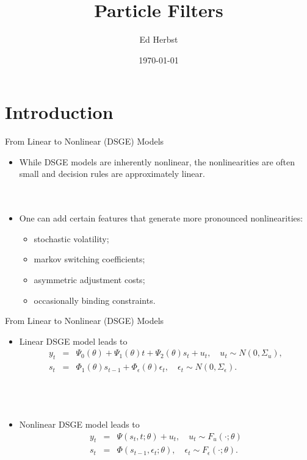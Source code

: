 \documentclass[presentation]{beamer}
\author{Ed Herbst}
\date{\today}
\title{Particle Filters}
\begin{document}
\maketitle






\section{Introduction}
\label{sec:org6a94952}

\begin{frame}[label={sec:org96c1168}]{From Linear to Nonlinear (DSGE) Models}
\begin{itemize}
\item While DSGE models are inherently nonlinear, the nonlinearities are often
small and decision rules are approximately linear.
\\~\\~
\item One can add certain features that generate more pronounced nonlinearities:
\begin{itemize}
\item stochastic volatility;
\item markov switching coefficients;
\item asymmetric adjustment costs;
\item occasionally binding constraints.
\end{itemize}
\end{itemize}
\end{frame}

\begin{frame}[label={sec:org626284e}]{From Linear to Nonlinear (DSGE) Models}
\begin{itemize}
\item Linear DSGE model leads to
\begin{eqnarray*}
        y_t &=& \Psi_0(\theta) + \Psi_1(\theta)t + \Psi_2(\theta) s_t + u_t, \quad u_t \sim N(0,\Sigma_u) ,\\
        s_t &=& \Phi_1(\theta)s_{t-1} + \Phi_\epsilon(\theta) \epsilon_t, \quad \epsilon_t \sim N(0,\Sigma_\epsilon). 
\end{eqnarray*}
\\~\\~
\item Nonlinear DSGE model leads to
\begin{eqnarray*}
        y_t &=& \Psi(s_t,t; \theta) + u_t, \quad u_t \sim F_u(\cdot;\theta) \label{eq_nlssnonlinear} \\
        s_t &=& \Phi(s_{t-1},\epsilon_t; \theta), \quad \epsilon_t \sim F_\epsilon(\cdot;\theta). 
\end{eqnarray*}
\end{itemize}
\end{frame}
\end{document}
